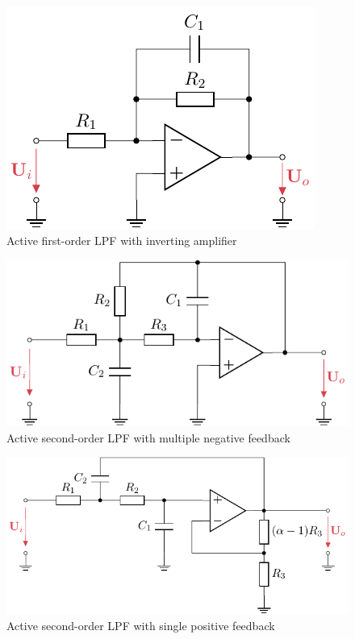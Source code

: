 \begin{figure}[!htb]
    \centering
    \includegraphics[scale=1]{figures/electronics/lowpass/lp_active_1ord_inv_amp/lp_active_1ord_inv_amp}
    \caption[Active first-order \ac{LPF} with inverting amplifier]{Active first-order \ac{LPF} with inverting amplifier}
    \label{fig:lp_active_1ord_inv_amp}
\end{figure}

\begin{figure}[!htb]
    \centering
    \includegraphics[scale=1]{figures/electronics/lowpass/lp_active_2ord_neg/lp_active_2ord_neg}
    \caption[Active second-order \ac{LPF} with multiple negative feedback]{Active second-order \ac{LPF} with multiple negative feedback}
    \label{fig:lp_active_2ord_neg}
\end{figure}

\begin{figure}[!htb]
    \centering
    \includegraphics[scale=1]{figures/electronics/lowpass/lp_active_2ord_pos/lp_active_2ord_pos}
    \caption[Active second-order \ac{LPF} with single positive feedback]{Active second-order \ac{LPF} with single positive feedback}
    \label{fig:lp_active_2ord_pos}
\end{figure}

